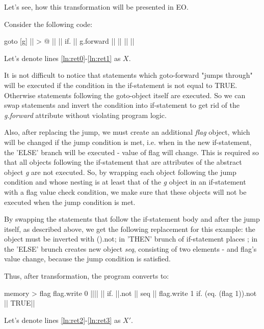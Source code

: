 \documentclass[sigplan,review,11pt,nonacm,natbib=false]{acmart}
\begin{document}
Let's see, how this transformation will be presented in EO.

Consider the following code:

\begin{ffcode}
goto
  [g]
    || > @ |$\label{ln:ret0}$|
      ||
      if.
        ||
        g.forward ||
        ||
      || |$\label{ln:ret1}$|
\end{ffcode}

Let's denote lines \ref{ln:ret0}-\ref{ln:ret1} as $X$.

It is not difficult to notice that statements which goto-forward "jumps through" will be executed if the condition in the if-statement is not equal to TRUE.
Otherwise statements following the goto-object itself are executed.
So we can swap statements and invert the condition into if-statement to get rid of the \emph{g.forward} attribute without violating program logic.

Also, after replacing the jump, we must create an additional \emph{flag} object, which will be changed if the jump condition is met, i.e. when in the new if-statement, the 'ELSE' branch will be executed - value of flag will change. This is required so that all objects following the if-statement that are attributes of the abstract object \emph{g} are not executed.
So, by wrapping each object following the jump condition and whose nesting is at least that of the \emph{g} object in an if-statement with a flag value check condition, we make sure that these objects will not be executed when the jump condition is met.

By swapping the statements that follow the if-statement body and after the jump itself, as described above, we get the following replacement for this example:
the  object must be inverted with ().not;
in 'THEN' brunch of if-statement places ; in the 'ELSE' brunch creates new object \emph{seq}, consisting of two elements -  and flag's value change, because the jump condition is satisfied.

Thus, after transformation, the program converts to:
\begin{ffcode}
memory > flag
flag.write 0
|||$\label{ln:ret2}$|
  ||
  if.
    ||.not
    ||
    seq
      ||
      flag.write 1
  if.
    (eq. (flag 1)).not
    ||
    TRUE|$\label{ln:ret3}$|
\end{ffcode}

Let's denote lines \ref{ln:ret2}-\ref{ln:ret3} as $X'$.
\end{document}
